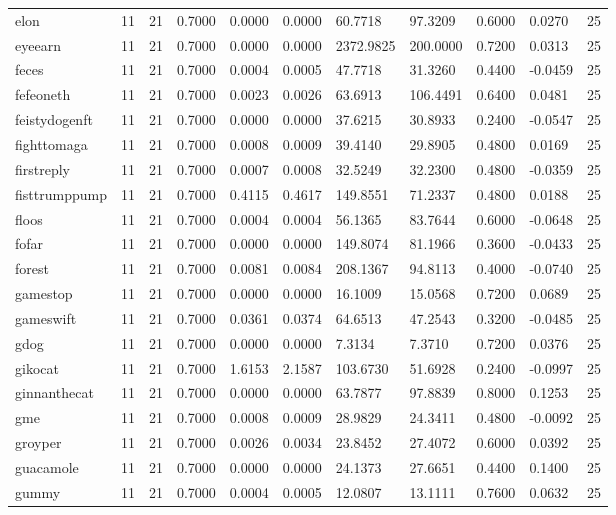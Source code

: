 \begin{table}[htbp]
\begin{tabular}{lllllllllll}
elon & 11 & 21 & 0.7000 & 0.0000 & 0.0000 & 60.7718 & 97.3209 & 0.6000 & 0.0270 & 25 \\
eyeearn & 11 & 21 & 0.7000 & 0.0000 & 0.0000 & 2372.9825 & 200.0000 & 0.7200 & 0.0313 & 25 \\
feces & 11 & 21 & 0.7000 & 0.0004 & 0.0005 & 47.7718 & 31.3260 & 0.4400 & -0.0459 & 25 \\
fefeoneth & 11 & 21 & 0.7000 & 0.0023 & 0.0026 & 63.6913 & 106.4491 & 0.6400 & 0.0481 & 25 \\
feistydogenft & 11 & 21 & 0.7000 & 0.0000 & 0.0000 & 37.6215 & 30.8933 & 0.2400 & -0.0547 & 25 \\
fighttomaga & 11 & 21 & 0.7000 & 0.0008 & 0.0009 & 39.4140 & 29.8905 & 0.4800 & 0.0169 & 25 \\
firstreply & 11 & 21 & 0.7000 & 0.0007 & 0.0008 & 32.5249 & 32.2300 & 0.4800 & -0.0359 & 25 \\
fisttrumppump & 11 & 21 & 0.7000 & 0.4115 & 0.4617 & 149.8551 & 71.2337 & 0.4800 & 0.0188 & 25 \\
floos & 11 & 21 & 0.7000 & 0.0004 & 0.0004 & 56.1365 & 83.7644 & 0.6000 & -0.0648 & 25 \\
fofar & 11 & 21 & 0.7000 & 0.0000 & 0.0000 & 149.8074 & 81.1966 & 0.3600 & -0.0433 & 25 \\
forest & 11 & 21 & 0.7000 & 0.0081 & 0.0084 & 208.1367 & 94.8113 & 0.4000 & -0.0740 & 25 \\
gamestop & 11 & 21 & 0.7000 & 0.0000 & 0.0000 & 16.1009 & 15.0568 & 0.7200 & 0.0689 & 25 \\
gameswift & 11 & 21 & 0.7000 & 0.0361 & 0.0374 & 64.6513 & 47.2543 & 0.3200 & -0.0485 & 25 \\
gdog & 11 & 21 & 0.7000 & 0.0000 & 0.0000 & 7.3134 & 7.3710 & 0.7200 & 0.0376 & 25 \\
gikocat & 11 & 21 & 0.7000 & 1.6153 & 2.1587 & 103.6730 & 51.6928 & 0.2400 & -0.0997 & 25 \\
ginnanthecat & 11 & 21 & 0.7000 & 0.0000 & 0.0000 & 63.7877 & 97.8839 & 0.8000 & 0.1253 & 25 \\
gme & 11 & 21 & 0.7000 & 0.0008 & 0.0009 & 28.9829 & 24.3411 & 0.4800 & -0.0092 & 25 \\
groyper & 11 & 21 & 0.7000 & 0.0026 & 0.0034 & 23.8452 & 27.4072 & 0.6000 & 0.0392 & 25 \\
guacamole & 11 & 21 & 0.7000 & 0.0000 & 0.0000 & 24.1373 & 27.6651 & 0.4400 & 0.1400 & 25 \\
gummy & 11 & 21 & 0.7000 & 0.0004 & 0.0005 & 12.0807 & 13.1111 & 0.7600 & 0.0632 & 25 \\

\end{tabular}
\end{table}
